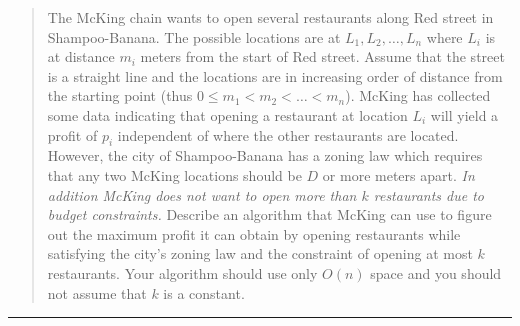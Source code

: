 \documentclass[11pt]{article}
\begin{document}



\begin{quote}
The McKing chain wants to open several restaurants along Red
  street in Shampoo-Banana. The possible locations are at $L_1,L_2,
  \ldots, L_n$ where $L_i$ is at distance $m_i$ meters from the start
  of Red street. Assume that the street is a straight line and the
  locations are in increasing order of distance from the starting
  point (thus $0 \leq m_1 < m_2 < \ldots < m_n$). McKing has collected
  some data indicating that opening a restaurant at location $L_i$
  will yield a profit of $p_i$ independent of where the other
  restaurants are located. However, the city of Shampoo-Banana has a
  zoning law which requires that any two McKing locations should be
  $D$ or more meters apart. {\em In addition McKing does not want to
    open more than $k$ restaurants due to budget constraints.}
  Describe an algorithm that McKing can use to figure out the maximum
  profit it can obtain by opening restaurants while satisfying the
  city's zoning law and the constraint of opening at most $k$
  restaurants.  Your algorithm should use only $O(n)$ space and you
  should not assume that $k$ is a constant.
\end{quote}
\hrule
\end{document}
